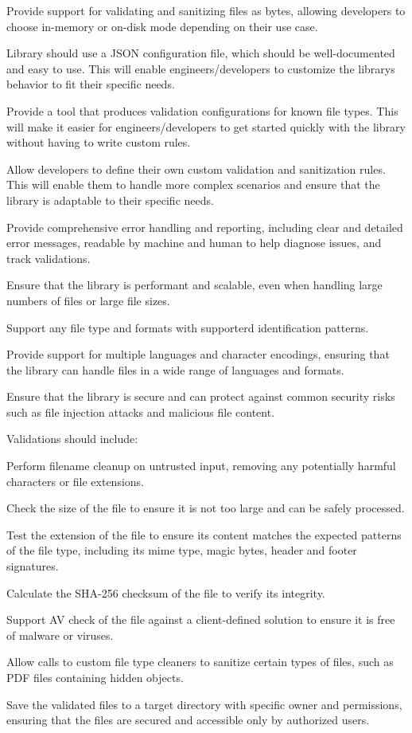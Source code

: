 Provide support for validating and sanitizing files as bytes, allowing developers to choose in-\/memory or on-\/disk mode depending on their use case.

Library should use a JSON configuration file, which should be well-\/documented and easy to use. This will enable engineers/developers to customize the library\textquotesingle{}s behavior to fit their specific needs.

Provide a tool that produces validation configurations for known file types. This will make it easier for engineers/developers to get started quickly with the library without having to write custom rules.

Allow developers to define their own custom validation and sanitization rules. This will enable them to handle more complex scenarios and ensure that the library is adaptable to their specific needs.

Provide comprehensive error handling and reporting, including clear and detailed error messages, readable by machine and human to help diagnose issues, and track validations.

Ensure that the library is performant and scalable, even when handling large numbers of files or large file sizes.

Support any file type and formats with supporterd identification patterns.

Provide support for multiple languages and character encodings, ensuring that the library can handle files in a wide range of languages and formats.

Ensure that the library is secure and can protect against common security risks such as file injection attacks and malicious file content.

Validations should include\+:
\begin{DoxyItemize}
\item Perform filename cleanup on untrusted input, removing any potentially harmful characters or file extensions.
\item Check the size of the file to ensure it is not too large and can be safely processed.
\item Test the extension of the file to ensure its content matches the expected patterns of the file type, including its mime type, magic bytes, header and footer signatures.
\item Calculate the SHA-\/256 checksum of the file to verify its integrity.
\item Support AV check of the file against a client-\/defined solution to ensure it is free of malware or viruses.
\item Allow calls to custom file type cleaners to sanitize certain types of files, such as PDF files containing hidden objects.
\item Save the validated files to a target directory with specific owner and permissions, ensuring that the files are secured and accessible only by authorized users. 
\end{DoxyItemize}